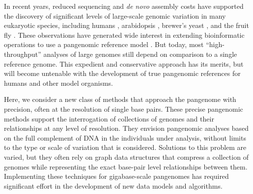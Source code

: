 
In recent years, reduced sequencing and \emph{de novo} assembly costs have supported the discovery of significant levels of large-scale genomic variation in many eukaryotic species, including humans \cite{sudmant2015integrated,Hehir-Kwa2016-hb,chaisson2018multi,Audano_2019}, arabidopsis \cite{alonso2016arabidopsis}, brewer's yeast \cite{yue2017contrasting}, and the fruit fly \cite{chakraborty2018hidden}. %
These observations have generated wide interest in extending bioinformatic operations to use a pangenomic reference model \cite{computational2016computational}.
But today, most ``high-throughput'' analyses of large genomes still depend on comparison to a single reference genome.
This expedient and conservative approach has its merits, but will become untenable with the development of true pangenomic references for humans \cite{Church2015-vt} and other model organisms.

Here, we consider a new class of methods that approach the pangenome with precision, often at the resolution of single base pairs.
These precise pangenomic methods support the interrogation of collections of genomes and their relationships at any level of resolution.
They envision pangenomic analyses based on the full complement of DNA in the individuals under analysis, without limits to the type or scale of variation that is considered.
Solutions to this problem are varied, but they often rely on graph data structures that compress a collection of genomes while representing the exact base-pair level relationships between them.
Implementing these techniques for gigabase-scale pangenomes has required significant effort in the development of new data models and algorithms. %


